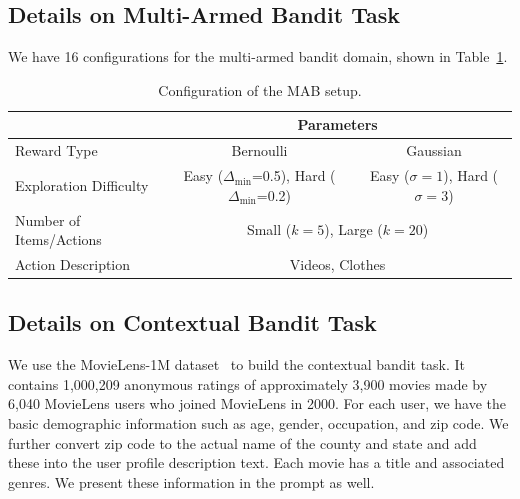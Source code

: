 \subsection{Details on Multi-Armed Bandit Task}
\label{app_subsec: mab}
We have 16 configurations for the multi-armed bandit domain, shown in Table~\ref{tab:mab_config}.

\begin{table}[h]
\centering
\small
\begin{tabular}{@{}l|cc@{}}
\toprule
                        & \multicolumn{2}{c}{Parameters}                                    \\ \midrule
Reward Type             & \multicolumn{1}{c|}{Bernoulli}              & Gaussian            \\ \midrule
Exploration Difficulty  & \multicolumn{1}{c|}{Easy ($\Delta_{\min}$=0.5), Hard ($\Delta_{\min}$=0.2)} & Easy ($\sigma=1$), Hard ($\sigma=3$) \\ \midrule
Number of Items/Actions & \multicolumn{2}{c}{Small ($k=5$), Large ($k=20$)}                         \\ \midrule
Action Description & \multicolumn{2}{c}{Videos, Clothes}                               \\ \bottomrule
\end{tabular}
\vspace{2mm}
\caption{Configuration of the MAB setup. }
\label{tab:mab_config}
\end{table}

\subsection{Details on Contextual Bandit Task}
\label{app_subsec: cb_detail}

We use the MovieLens-1M dataset~\citep{harper2015movielens} to build the contextual bandit task. It contains 1,000,209 anonymous ratings of approximately 3,900 movies 
made by 6,040 MovieLens users who joined MovieLens in 2000. For each user, we have the basic demographic information such as age, gender, occupation, and zip code. We further convert zip code to the actual name of the county and state and add these into the user profile description text. Each movie has a title and associated genres. We present these information in the prompt as well.

